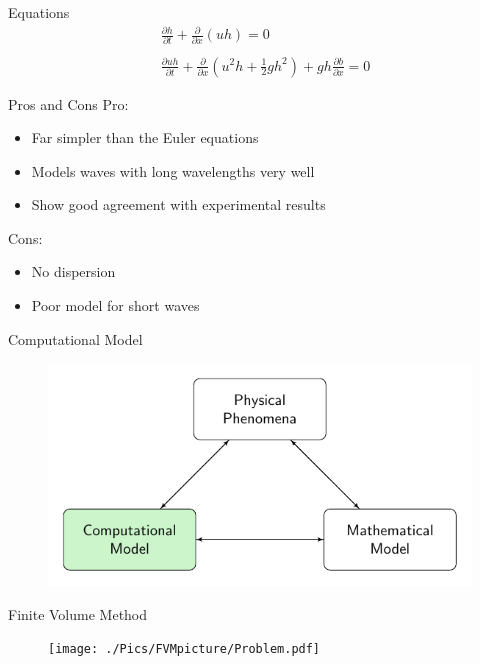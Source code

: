 \documentclass[pdf]{beamer}
\begin{document}
\begin{frame}{Equations}
	\begin{align}
	&\frac{\partial h}{\partial t} + \frac{\partial }{\partial x}\left( uh\right) = 0 \\ \nonumber \\
	&\frac{\partial u h}{\partial t} + \frac{\partial }{\partial x}\left( u^2h + \frac{1}{2}gh^2\right) + gh\frac{\partial b}{\partial x} = 0
	\end{align}
\end{frame}
\begin{frame}{Pros and Cons}
	Pro:
	\begin{itemize}
		\item Far simpler than the Euler equations
		\item Models waves with long wavelengths very well 
		\item Show good agreement with experimental results
	\end{itemize}
	Cons:
	\begin{itemize}
		\item No dispersion
		\item Poor model for short waves 
	\end{itemize}
\end{frame}
\begin{frame}{Computational Model}
		\begin{figure}
			\includegraphics[width=\textwidth]{./Pics/ModelDiagrams/FlowChartHigh3G.pdf}
		\end{figure}
\end{frame}
\begin{frame}{Finite Volume Method}
	\begin{figure}
		\texttt{[image: ./Pics/FVMpicture/Problem.pdf]}
	\end{figure}
\end{frame}
\end{document}
